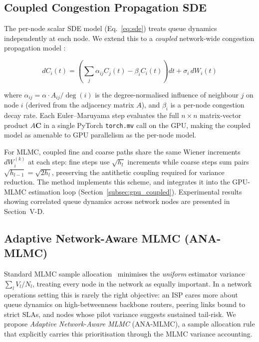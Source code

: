 \documentclass{ieeeaccess}
\begin{document}
\subsection{Coupled Congestion Propagation SDE}
\label{subsec:spatial}

The per-node scalar SDE model (Eq.~\eqref{eq:sde}) treats queue dynamics independently at each
node. We extend this to a \emph{coupled} network-wide congestion propagation model
\cite{kang2007,harrison1985,mandelbaum2014stochastic}:

\begin{equation}
    dC_i(t) = \left(\sum_j \alpha_{ij} C_j(t) - \beta_i C_i(t)\right)dt
              + \sigma_i\, dW_i(t)
    \label{eq:coupled_sde}
\end{equation}

\noindent where $\alpha_{ij} = \alpha \cdot A_{ij} / \deg(i)$ is the degree-normalised influence
of neighbour $j$ on node $i$ (derived from the adjacency matrix $A$), and $\beta_i$ is a per-node
congestion decay rate. Each Euler--Maruyama step evaluates the full $n \times n$ matrix-vector
product $A\mathbf{C}$ in a single PyTorch \texttt{torch.mv} call on the GPU, making the coupled
model as amenable to GPU parallelism as the per-node model.

For MLMC, coupled fine and coarse paths share the same Wiener increments $dW_i^{(k)}$ at each
step: fine steps use $\sqrt{h_l}$ increments while coarse steps sum pairs
$\sqrt{h_{l-1}} = \sqrt{2h_l}$, preserving the antithetic coupling required for variance
reduction. The  method implements this
scheme, and  integrates it into the GPU-MLMC estimation loop
(Section~\ref{subsec:gpu_coupled}). Experimental results showing correlated queue dynamics across
network nodes are presented in Section~V-D.

\subsection{Adaptive Network-Aware MLMC (ANA-MLMC)}
\label{subsec:ana_mlmc}

Standard MLMC sample allocation~\cite{giles2015multilevel} minimises the \emph{uniform}
estimator variance $\sum_l V_l/N_l$, treating every node in the network as equally important.
In a network operations setting this is rarely the right objective: an ISP cares more about queue
dynamics on high-betweenness backbone routers, peering links bound to strict SLAs, and nodes
whose pilot variance suggests sustained tail-risk. We propose \emph{Adaptive Network-Aware MLMC}
(ANA-MLMC), a sample allocation rule that explicitly carries this prioritisation through the MLMC
variance accounting.
\end{document}

